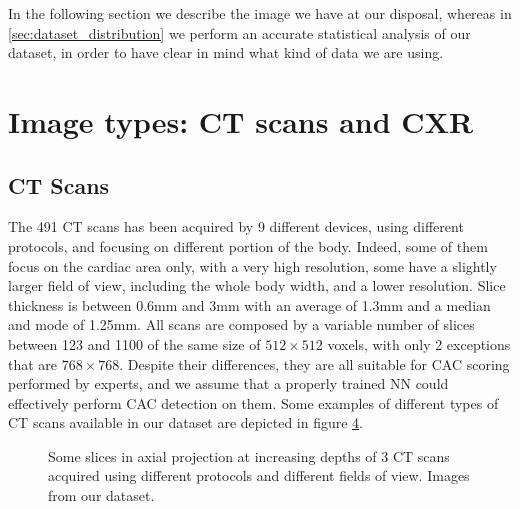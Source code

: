 In the following section we describe the image we have at our disposal, whereas in \ref{sec:dataset_distribution} we perform an accurate statistical analysis of our dataset, in order to have clear in mind what kind of data we are using.


\section{Image types: CT scans and CXR}

\subsection{CT Scans}

The 491 CT scans has been acquired by 9 different devices, using different protocols, and focusing on different portion of the body.
Indeed, some of them focus on the cardiac area only, with a very high resolution, some have a slightly larger field of view, including the whole body width, and a lower resolution.
Slice thickness is between 0.6mm and 3mm with an average of 1.3mm and a median and mode of 1.25mm.
All scans are composed by a variable number of slices between 123 and 1100 of the same size of $512 \times 512$ voxels, with only 2 exceptions that are $768 \times 768$.
Despite their differences, they are all suitable for CAC scoring performed by experts, and we assume that a properly trained NN could effectively perform CAC detection on them.
Some examples of different types of CT scans available in our dataset are depicted in figure \ref{fig:ct_example}.

\begin{figure}
    \centering
    \begin{subfigure}[b]{0.3\textwidth}
        \caption{}
        \label{subfig:ct_example_large}
    \end{subfigure}\hspace{1em}
    \begin{subfigure}[b]{0.3\textwidth}
        \caption{}
        \label{subfig:ct_example_medium}
    \end{subfigure}\hspace{1em}
    \begin{subfigure}[b]{0.3\textwidth}
        \caption{}
        \label{subfig:ct_example_small}
    \end{subfigure}
    
    \caption{Some slices in axial projection at increasing depths of 3 CT scans acquired using different protocols and different fields of view. Images from our dataset.}
    \label{fig:ct_example}
\end{figure}


